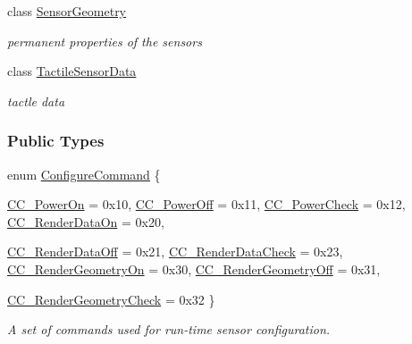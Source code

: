 \begin{DoxyCompactItemize}
class \hyperlink{classOpenRAVE_1_1SensorBase_1_1SensorGeometry}{SensorGeometry}
\begin{DoxyCompactList}\small\item\em permanent properties of the sensors \item\end{DoxyCompactList}\item 
class \hyperlink{classOpenRAVE_1_1SensorBase_1_1TactileSensorData}{TactileSensorData}
\begin{DoxyCompactList}\small\item\em tactle data \item\end{DoxyCompactList}\end{DoxyCompactItemize}
\subsubsection*{Public Types}
\begin{DoxyCompactItemize}
\item 
enum \hyperlink{classOpenRAVE_1_1SensorBase_a48dea54d66d3cd48fda033d19cad7dbc}{ConfigureCommand} \{ \par
\hyperlink{classOpenRAVE_1_1SensorBase_a48dea54d66d3cd48fda033d19cad7dbcaa12aa3389243d888c0211e5e84a2bec3}{CC\_\-PowerOn} = 0x10, 
\hyperlink{classOpenRAVE_1_1SensorBase_a48dea54d66d3cd48fda033d19cad7dbcabe79d3489e53b22662cb01e3fd5a2aa4}{CC\_\-PowerOff} = 0x11, 
\hyperlink{classOpenRAVE_1_1SensorBase_a48dea54d66d3cd48fda033d19cad7dbcadf063ee2e225c3f6714361882241089f}{CC\_\-PowerCheck} = 0x12, 
\hyperlink{classOpenRAVE_1_1SensorBase_a48dea54d66d3cd48fda033d19cad7dbcaaf7af7837769edb49e4b9366044b8ebc}{CC\_\-RenderDataOn} = 0x20, 
\par
\hyperlink{classOpenRAVE_1_1SensorBase_a48dea54d66d3cd48fda033d19cad7dbca6b764a7cba110931b6035302dd83b574}{CC\_\-RenderDataOff} = 0x21, 
\hyperlink{classOpenRAVE_1_1SensorBase_a48dea54d66d3cd48fda033d19cad7dbcadc438b5d23e19d70df1e4425302e26d0}{CC\_\-RenderDataCheck} = 0x23, 
\hyperlink{classOpenRAVE_1_1SensorBase_a48dea54d66d3cd48fda033d19cad7dbca6041933887566ae587fb1babcfa3794d}{CC\_\-RenderGeometryOn} = 0x30, 
\hyperlink{classOpenRAVE_1_1SensorBase_a48dea54d66d3cd48fda033d19cad7dbcac80f84e0b1dab127526e2c7517f9fd16}{CC\_\-RenderGeometryOff} = 0x31, 
\par
\hyperlink{classOpenRAVE_1_1SensorBase_a48dea54d66d3cd48fda033d19cad7dbca0f1f04ef2d988fc5e5bc061c6eba352e}{CC\_\-RenderGeometryCheck} = 0x32
 \}
\begin{DoxyCompactList}\small\item\em A set of commands used for run-\/time sensor configuration. \item\end{DoxyCompactList}\end{DoxyCompactItemize}
